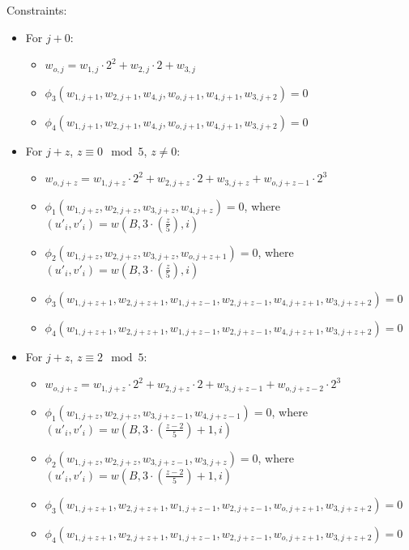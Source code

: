 Constraints:
\begin{itemize}
	\item For $j + 0$:
	\begin{itemize}
		\item $w_{o, j} = w_{1, j} \cdot 2^2 + w_{2, j} \cdot 2 + w_{3, j}$ 
		\item $\phi_3(w_{1, j + 1}, w_{2, j + 1}, w_{4, j}, w_{o, j + 1}, w_{4, j + 1}, w_{3, j + 2}) = 0$
		\item $\phi_4(w_{1, j + 1}, w_{2, j + 1}, w_{4, j}, w_{o, j + 1}, w_{4, j + 1}, w_{3, j + 2}) = 0$
	\end{itemize}
	\item For $j + z$, $z \equiv 0 \mod 5$, $z \neq 0$:
	\begin{itemize}
		\item $w_{o, j + z} = w_{1, j + z} \cdot 2^2 + w_{2, j + z} \cdot 2 + w_{3, j + z} + w_{o, j + z - 1} \cdot 2^3$ 
		\item $\phi_1(w_{1, j + z}, w_{2, j + z}, w_{3, j + z}, w_{4, j + z}) = 0$, where $(u'_{i}, v'_{i}) = w(B, 3 \cdot (\frac{z}{5}), i)$
		\item $\phi_2(w_{1, j + z}, w_{2, j + z}, w_{3, j + z}, w_{o, j + z + 1}) = 0$, where $(u'_{i}, v'_{i}) = w(B, 3 \cdot (\frac{z}{5}), i)$
		\item $\phi_3(w_{1, j + z + 1}, w_{2, j + z + 1}, w_{1, j + z - 1}, w_{2, j + z - 1}, w_{4, j + z + 1}, w_{3, j + z + 2}) = 0$
		\item $\phi_4(w_{1, j + z + 1}, w_{2, j + z + 1}, w_{1, j + z - 1}, w_{2, j + z - 1}, w_{4, j + z + 1}, w_{3, j + z + 2}) = 0$
	\end{itemize}
	\item For $j + z$, $z \equiv 2 \mod 5$:
	\begin{itemize}
		\item $w_{o, j + z} = w_{1, j + z} \cdot 2^2 + w_{2,j + z} \cdot 2 + w_{3, j + z - 1} + w_{o, j+ z - 2} \cdot 2^3$
		\item $\phi_1(w_{1, j + z}, w_{2, j + z}, w_{3, j + z - 1}, w_{4, j + z - 1}) = 0$, where $(u'_{i}, v'_{i}) = w(B, 3 \cdot (\frac{z - 2}{5}) + 1, i)$
		\item $\phi_2(w_{1, j + z}, w_{2, j + z}, w_{3, j + z - 1}, w_{3, j + z}) = 0$, where $(u'_{i}, v'_{i}) = w(B, 3 \cdot (\frac{z - 2}{5}) + 1, i)$
		\item $\phi_3(w_{1, j + z + 1}, w_{2, j + z + 1}, w_{1, j + z - 1}, w_{2, j + z - 1}, w_{o, j + z + 1}, w_{3, j + z + 2}) = 0$
		\item $\phi_4(w_{1, j + z + 1}, w_{2, j + z + 1}, w_{1, j + z - 1}, w_{2, j + z - 1}, w_{o, j + z + 1}, w_{3, j + z + 2}) = 0$

\end{itemize}
\end{itemize}

